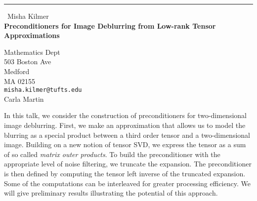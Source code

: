 \documentclass{report}
\begin{document}
\begin{center}
\rule{6in}{1pt} \
{\large Misha Kilmer \\
{\bf Preconditioners for Image Deblurring from Low-rank Tensor Approximations }}

Mathematics Dept \\ 503 Boston Ave \\ Medford \\ MA 02155
\\
{\tt misha.kilmer@tufts.edu}\\
Carla Martin\end{center}


In this talk, we consider the construction of preconditioners for
two-dimensional image deblurring.
First, we make an approximation that allows us to model the blurring as a special
product between a third order tensor and a two-dimensional image.
Building on a new notion
of tensor SVD, we express the tensor as a sum of so called {\it matrix
outer products}. To build the preconditioner
with the appropriate level of noise filtering, we truncate the expansion.
The preconditioner is then defined by
computing the tensor left inverse of the truncated expansion. Some of the
computations can be interleaved
for greater processing efficiency. We will give preliminary results
illustrating the potential of this approach.
\end{document}
